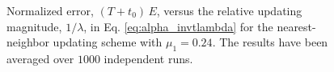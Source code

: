 \documentclass[reprint, floatfix]{revtex4-1}
\begin{document}


\begin{figure}[h]
\begin{center}
  \caption{
    \label{fig:err_nnbr}
    Normalized error, $(T + t_0) \, E$,
    versus the %
    relative updating magnitude,
    $1/\lambda$,
    in Eq. \eqref{eq:alpha_invtlambda}
    for the nearest-neighbor updating scheme with $\mu_1 = 0.24$.
    The results have been averaged over $1000$ independent runs.
  }
\end{center}
\end{figure}





%
%
%
%
%
\end{document}
